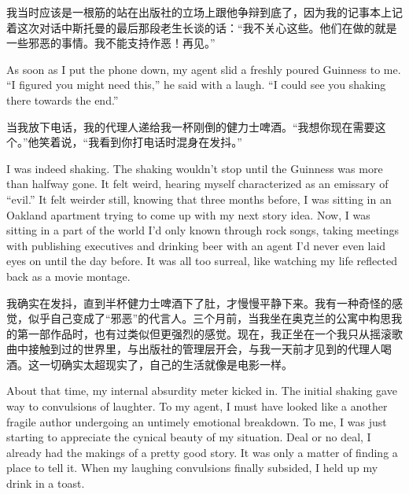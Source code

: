 \ifdefined\chs
我当时应该是一根筋的站在出版社的立场上跟他争辩到底了，因为我的记事本上记着这次对话中斯托曼的最后那段老生长谈的话：``我不关心这些。他们在做的就是一些邪恶的事情。我不能支持作恶！再见。''%
\fi

\ifdefined\eng
As soon as I put the phone down, my agent slid a freshly poured Guinness to me. ``I figured you might need this,'' he said with a laugh. ``I could see you shaking there towards the end.''
\fi

\ifdefined\chs
当我放下电话，我的代理人递给我一杯刚倒的健力士啤酒。``我想你现在需要这个。''他笑着说，``我看到你打电话时混身在发抖。''
\fi

\ifdefined\eng
I was indeed shaking. The shaking wouldn't stop until the Guinness was more than halfway gone. It felt weird, hearing myself characterized as an emissary of ``evil.'' %
It felt weirder still, knowing that three months before, I was sitting in an Oakland apartment trying to come up with my next story idea. Now, I was sitting in a part of the world I'd only known through rock songs, taking meetings with publishing executives and drinking beer with an agent I'd never even laid eyes on until the day before. It was all too surreal, like watching my life reflected back as a movie montage.
\fi

\ifdefined\chs
我确实在发抖，直到半杯健力士啤酒下了肚，才慢慢平静下来。我有一种奇怪的感觉，似乎自己变成了``邪恶''的代言人。三个月前，当我坐在奥克兰的公寓中构思我的第一部作品时，也有过类似但更强烈的感觉。现在，我正坐在一个我只从摇滚歌曲中接触到过的世界里，与出版社的管理层开会，与我一天前才见到的代理人喝酒。这一切确实太超现实了，自己的生活就像是电影一样。
\fi

\ifdefined\eng
About that time, my internal absurdity meter kicked in. The initial shaking gave way to convulsions of laughter. To my agent, I must have looked like a another fragile author undergoing an untimely emotional breakdown. To me, I was just starting to appreciate the cynical beauty of my situation. Deal or no deal, I already had the makings of a pretty good story. It was only a matter of finding a place to tell it. When my laughing convulsions finally subsided, I held up my drink in a toast.
\fi

